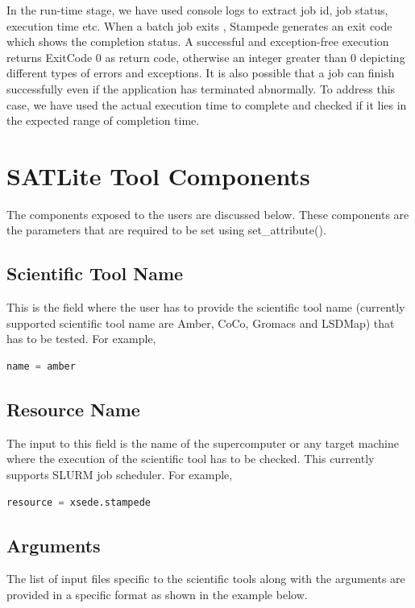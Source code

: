 \documentclass[10pt]{ruthesis}
\begin{document}
In the run-time stage, we have used console logs to extract job id, job status, execution time etc. When a batch job exits \cite{ref6}, Stampede generates an exit code which shows the completion status. A successful and exception-free execution returns ExitCode 0 as return code, otherwise an integer greater than 0 depicting different types of errors and exceptions. It is also possible that a job can finish successfully even if the application has terminated abnormally. To address this case, we have used the actual execution time to complete and checked if it lies in the expected range of completion time.

\section{SATLite Tool Components}
The components exposed to the users are discussed below. These components are the parameters that are required to be set using set\_attribute().

\subsection{Scientific Tool Name}
This is the field where the user has to provide the scientific tool name (currently supported scientific tool name are Amber, CoCo, Gromacs and LSDMap) that has to be tested. For example,

\begin{lstlisting}[language=Python,linewidth=3.7cm]
  name = amber
\end{lstlisting}

\subsection{Resource Name}
The input to this field is the name of the supercomputer or any target machine where the execution of the scientific tool has to be checked. This currently supports SLURM job scheduler. For example,

\begin{lstlisting}[language=Python,linewidth=5.7cm]
 resource = xsede.stampede
\end{lstlisting}


\subsection{Arguments}
The list of input files specific to the scientific tools along with the arguments are provided in a specific format as shown in the example below.
\end{document}
